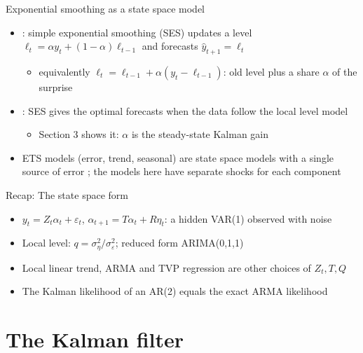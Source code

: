 \begin{frame}{Exponential smoothing as a state space model}
\itemsize{\small}
\begin{itemize}
    \item {}: simple exponential smoothing (SES) updates a level $\ell_t = \alpha y_t + (1-\alpha)\ell_{t-1}$ and forecasts $\hat y_{t+1} = \ell_t$
    \begin{itemize}
        \item equivalently $\ell_t = \ell_{t-1} + \alpha(y_t - \ell_{t-1})$: old level plus a share $\alpha$ of the surprise
    \end{itemize}
    \item {}: SES gives the optimal forecasts when the data follow the local level model
    \begin{itemize}
        \item Section 3 shows it: $\alpha$ is the steady-state Kalman gain
    \end{itemize}
    \item ETS models (error, trend, seasonal) are state space models with a single source of error ; the models here have separate shocks for each component
\end{itemize}
\end{frame}

\begin{frame}{Recap: The state space form}
\itemsize{\small}
\begin{itemize}
    \item $y_t = Z_t\alpha_t + \varepsilon_t$, $\alpha_{t+1} = T\alpha_t + R\eta_t$: a hidden VAR(1) observed with noise
    \item Local level: $q = \sigma^2_\eta/\sigma^2_\varepsilon$; reduced form ARIMA(0,1,1)
    \item Local linear trend, ARMA and TVP regression are other choices of $Z_t, T, Q$
    \item The Kalman likelihood of an AR(2) equals the exact ARMA likelihood
\end{itemize}
\end{frame}


\section{The Kalman filter}

